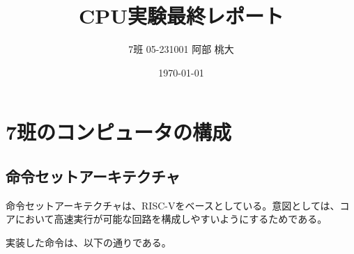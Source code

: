 \documentclass[a4paper,11pt]{ltjsarticle}
\begin{document}
\title{CPU実験最終レポート}
\author{7班 05-231001 阿部 桃大}
\date{\today}
\maketitle

\section{7班のコンピュータの構成}
\subsection*{命令セットアーキテクチャ}
命令セットアーキテクチャは、RISC-Vをベースとしている。意図としては、コアにおいて高速実行が可能な回路を構成しやすいようにするためである。

実装した命令は、以下の通りである。
\end{document}
